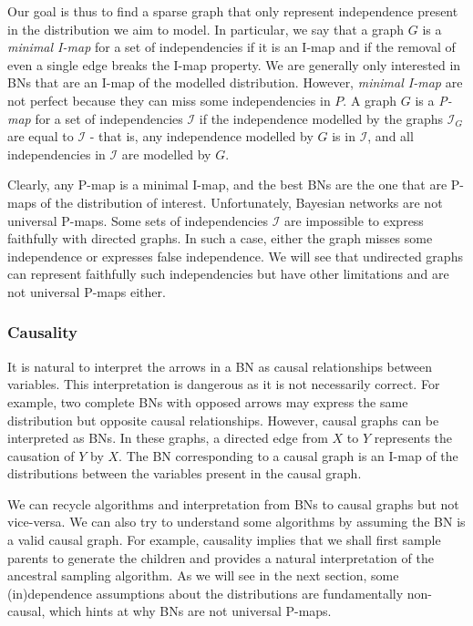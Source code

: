 Our goal is thus to find a sparse graph that only represent independence present in the distribution we aim to model. In particular, we say that a graph $G$ is a \textit{minimal I-map} for a set of independencies if it is an I-map and if the removal of even a single edge breaks the I-map property. We are generally only interested in BNs that are an I-map of the modelled distribution. However, \textit{minimal I-map} are not perfect because they can miss some independencies in $P$. A graph $G$ is a \textit{P-map} for a set of independencies $\mathcal{I}$ if the independence modelled by the graphs $\mathcal{I}_G$ are equal to $\mathcal{I}$ - that is, any independence modelled by $G$ is in $\mathcal{I}$, and all independencies in $\mathcal{I}$ are modelled by  $G$.

Clearly, any P-map is a minimal I-map, and the best BNs are the one that are P-maps of the distribution of interest. Unfortunately, Bayesian networks are not universal P-maps. Some sets of independencies $\mathcal{I}$ are impossible to express faithfully with directed graphs. In such a case, either the graph misses some independence or expresses false independence. We will see that undirected graphs can represent faithfully such independencies but have other limitations and are not universal P-maps either.
\subsubsection{Causality}
It is natural to interpret the arrows in a BN as causal relationships between variables. This interpretation is dangerous as it is not necessarily correct. For example, two complete BNs with opposed arrows may express the same distribution but opposite causal relationships. However, causal graphs can be interpreted as BNs. In these graphs, a directed edge from $X$ to $Y$ represents the causation of $Y$ by $X$. The BN corresponding to a causal graph is an I-map of the distributions between the variables present in the causal graph.

We can recycle algorithms and interpretation from BNs to causal graphs but not vice-versa. We can also try to understand some algorithms by assuming the BN is a valid causal graph. For example, causality implies that we shall first sample parents to generate the children and provides a natural interpretation of the ancestral sampling algorithm. As we will see in the next section, some (in)dependence assumptions about the distributions are fundamentally non-causal, which hints at why BNs are not universal P-maps.

